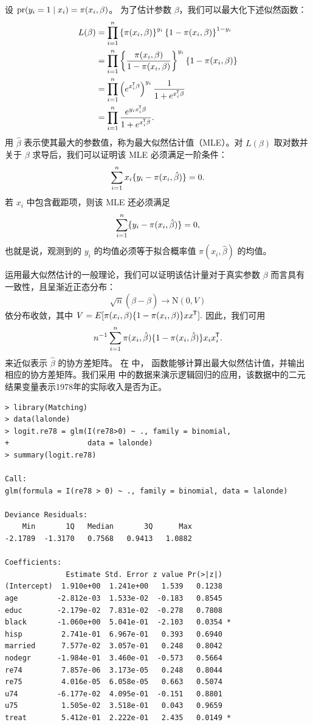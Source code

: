 设 $\textup{pr}(y_{i}=1\mid x_{i}) = \pi(x_{i},\beta)$。  
为了估计参数 $\beta$，我们可以最大化下述似然函数：  
\begin{align*}
L(\beta)  
&=\prod_{i=1}^{n}\left\{ \pi(x_{i},\beta)\right\} ^{y_{i}}\left\{ 1-\pi(x_{i},\beta)\right\} ^{1-y_{i}} \\
& =\prod_{i=1}^{n}\left\{ \frac{\pi(x_{i},\beta)}{1-\pi(x_{i},\beta)}\right\} ^{y_{i}}\left\{ 1-\pi(x_{i},\beta)\right\} \\
 & =\prod_{i=1}^{n}\left(e^{x_{i} ^{\mkern-1.5mu\mathsf{T}} \beta}\right)^{y_{i}}\frac{1}{1+e^{x_{i} ^{\mkern-1.5mu\mathsf{T}} \beta}}\\
 & =\prod_{i=1}^{n}\frac{e^{y_{i}x_{i} ^{\mkern-1.5mu\mathsf{T}} \beta}}{1+e^{x_{i} ^{\mkern-1.5mu\mathsf{T}} \beta}}.
\end{align*}  
用 $\hat{\beta}$ 表示使其最大的参数值，称为最大似然估计值（MLE）。对 $L(\beta)  $ 取对数并关于 $\beta$ 求导后，我们可以证明该 MLE 必须满足一阶条件：
$$
\sum_{i=1}^n  x_i  \{ y_i - \pi(x_{i}, \hat\beta)\} = 0.
$$  
若 $x_i$ 中包含截距项，则该 MLE 还必须满足  
$$
\sum_{i=1}^n    \{ y_i - \pi(x_{i}, \hat\beta)\} = 0,
$$  
也就是说，观测到的 $y_i$ 的均值必须等于拟合概率值 $ \pi(x_{i}, \hat\beta)$ 的均值。


运用最大似然估计的一般理论，我们可以证明该估计量对于真实参数 $\beta$ 而言具有一致性，且呈渐近正态分布：
$$
\sqrt{n}( \hat{\beta} -  \beta) \rightarrow \text{N}(0, V)
$$
依分布收敛，其中
$
V = E [  \pi(x_{i},\beta) \{1-  \pi(x_{i},\beta)\} x x^{\mkern-1.5mu\mathsf{T}}   ].
$
因此，我们可用 $$
n^{-1} \sum_{i=1}^n \pi(x_{i}, \hat\beta) \{1-  \pi(x_{i},\hat\beta)\}   x_i x_i^{\mkern-1.5mu\mathsf{T}}.
$$ 来近似表示 $\hat{\beta} $ 的协方差矩阵。
在  中， 函数能够计算出最大似然估计值，并输出相应的协方差矩阵。我们采用  中的数据来演示逻辑回归的应用，该数据中的二元结果变量表示1978年的实际收入是否为正。



\begin{lstlisting}
> library(Matching)
> data(lalonde)
> logit.re78 = glm(I(re78>0) ~ ., family = binomial, 
+                  data = lalonde)
> summary(logit.re78)

Call:
glm(formula = I(re78 > 0) ~ ., family = binomial, data = lalonde)

Deviance Residuals: 
    Min       1Q   Median       3Q      Max  
-2.1789  -1.3170   0.7568   0.9413   1.0882  

Coefficients:
              Estimate Std. Error z value Pr(>|z|)  
(Intercept)  1.910e+00  1.241e+00   1.539   0.1238  
age         -2.812e-03  1.533e-02  -0.183   0.8545  
educ        -2.179e-02  7.831e-02  -0.278   0.7808  
black       -1.060e+00  5.041e-01  -2.103   0.0354 *
hisp         2.741e-01  6.967e-01   0.393   0.6940  
married      7.577e-02  3.057e-01   0.248   0.8042  
nodegr      -1.984e-01  3.460e-01  -0.573   0.5664  
re74         7.857e-06  3.173e-05   0.248   0.8044  
re75         4.016e-05  6.058e-05   0.663   0.5074  
u74         -6.177e-02  4.095e-01  -0.151   0.8801  
u75          1.505e-02  3.518e-01   0.043   0.9659  
treat        5.412e-01  2.222e-01   2.435   0.0149 *
\end{lstlisting}

